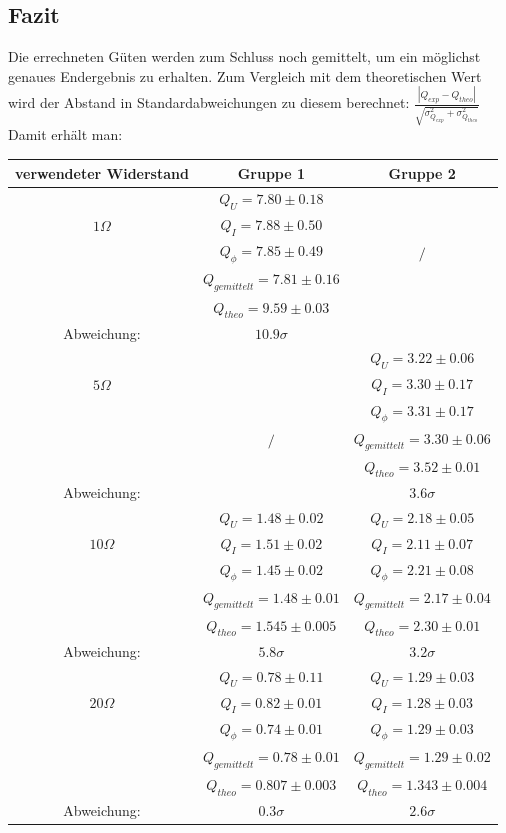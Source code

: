 \documentclass[a4paper, 11pt]{article}
\begin{document}
\newpage
\subsection{Fazit}
Die errechneten Güten werden zum Schluss noch gemittelt, um ein möglichst genaues Endergebnis zu erhalten. Zum Vergleich mit dem theoretischen Wert wird der Abstand in Standardabweichungen zu diesem berechnet: $\frac{|Q_{exp} - Q_{theo}|}{\sqrt{\sigma_{Q_{exp}}^2 + \sigma_{Q_{theo}}^2}}$ \newline
Damit erhält man:
\begin{center}
\renewcommand{\arraystretch}{1}
\begin{tabular}{|c|c|c|}
\hline verwendeter Widerstand	&	Gruppe 1	&	Gruppe 2	\\
\hline $ $ 	&	$ Q_U = 7.80 \pm 0.18$		&	$ $		\\
	 $ 1 \Omega$ 	&	$ Q_I = 7.88 \pm 0.50$		&	$ $		\\
	 $ $ 	&	$ Q_{\phi} = 7.85 \pm 0.49$		&	$ /  $		\\
	 $ $	&	$ Q_{gemittelt}	= 7.81 \pm 0.16$	&	$ $	\\
	 $ $	&	$ Q_{theo} = 9.59 \pm 0.03$	&	$ $		\\
	 Abweichung:	&	$ 10.9 \sigma$		&	$ $		\\
\hline $ $ 	&	$ $		&	$ Q_U =  3.22 \pm 0.06$		\\
	 $ 5 \Omega$ 	&	$ $		&	$ Q_I = 3.30 \pm 0.17 $		\\
	 $ $ 	&	$ $		&	$ Q_{\phi} = 3.31 \pm 0.17 $		\\
	 $ $	&	$ / $	&	$ Q_{gemittelt} = 3.30 \pm 0.06$	\\
	 $ $	&	$ $	&	$Q_{theo} = 3.52 \pm 0.01 $		\\
	 Abweichung:	&	$ $		&	$ 3.6 \sigma $		\\
\hline $ $ 	&	$ Q_U = 1.48 \pm 0.02$		&	$ Q_U = 2.18 \pm 0.05 $		\\
	 $ 10 \Omega$ 	&	$ Q_I = 1.51 \pm 0.02$		&	$ Q_I = 2.11 \pm 0.07 $		\\
	 $ $ 	&	$ Q_{\phi} = 1.45 \pm 0.02$		&	$ Q_{\phi} = 2.21 \pm 0.08 $		\\
	 $ $	&	$ Q_{gemittelt}	= 1.48 \pm 0.01$	&	$ Q_{gemittelt} = 2.17 \pm 0.04$	\\
	 $ $	&	$ Q_{theo} = 1.545 \pm 0.005$	&	$Q_{theo} = 2.30 \pm 0.01$		\\
	 Abweichung:	&	$ 5.8 \sigma $		&	$ 3.2 \sigma $		\\
\hline $ $ 	&	$ Q_U = 0.78 \pm 0.11$		&	$ Q_U =  1.29 \pm 0.03$		\\
	 $ 20 \Omega$ 	&	$ Q_I = 0.82 \pm 0.01$		&	$ Q_I = 1.28 \pm 0.03 $		\\
	 $ $ 	&	$ Q_{\phi} = 0.74 \pm 0.01$		&	$ Q_{\phi} =  1.29 \pm 0.03$		\\
	 $ $	&	$ Q_{gemittelt}	= 0.78 \pm 0.01$	&	$ Q_{gemittelt} = 1.29 \pm 0.02$	\\
	 $ $	&	$ Q_{theo} = 0.807 \pm 0.003	$	&	$Q_{theo} = 1.343 \pm 0.004$		\\
	 Abweichung:	&	$ 0.3 \sigma $		&	$ 2.6 \sigma $		\\
\hline
\end{tabular}
\end{center}
\end{document}

